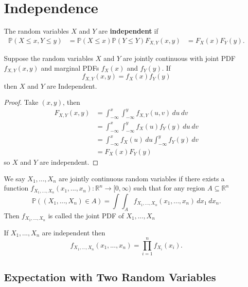 \section{Independence}

\begin{definition}
  The random variables $X$ and $Y$ are {\bf independent} if
    \begin{align*}
      \mathbb{P}(X \leq x, Y\leq y) &= \mathbb{P}(X \leq x)\mathbb{P}(Y \leq Y)
      F_{X,Y}(x,y) &= F_X(x)F_Y(y)
    .\end{align*}
\end{definition}

\begin{theorem}
  Suppose the random variables $X$ and $Y$ are jointly continuous with joint PDF $f_{X,Y}(x,y)$ and marginal PDFs $f_X(x)$ and $f_Y(y)$. If
  \[f_{X,Y}(x, y) = f_X(x) f_Y(y)\]
  then $X$ and $Y$ are Independent.

\end{theorem}
\begin{proof}
    Take $(x,y)$, then
    \begin{align*}
      F_{X,Y}(x,y) &= \int_{-\infty}^x \int_{-\infty}^y f_{X, Y}(u,v) \ du \ dv \\
      &= \int_{-\infty}^x \int_{-\infty}^y f_{X}(u) f_Y(y) \ du \ dv \\
      &= \int_{-\infty}^x f_{X}(u) \ du \int_{-\infty}^y  f_Y(y) \ dv \\
      &= F_X(x) F_Y(y)
    \end{align*}
    so $X$ and $Y$ are independent.
\end{proof}

\begin{definition}
We say $X_1,...,X_n$ are jointly continuous random variables if there exists a function $f_{X_1,...,X_n}(x_1,...,x_n): \mathbb{R}^n \rightarrow [0, \infty)$ such that for any region $A \subseteq \mathbb{R}^n$
\[\mathbb{P}((X_1,...,X_n) \in A) = \int \int_A f_{X_1,...,X_n}(x_1,...,x_n) \ dx_1 \ dx_n.\]
Then $f_{X_1,...,X_n}$ is called the joint PDF of $X_1,...,X_n$
\end{definition}

\begin{remark}
If $X_1,...,X_n$ are independent then
\[f_{X_1,...,X_n}(x_1,...,x_n) = \prod_{i= 1}^n f_{X_i}(x_i).\]
\end{remark}
\subsection{Expectation with Two Random Variables}

